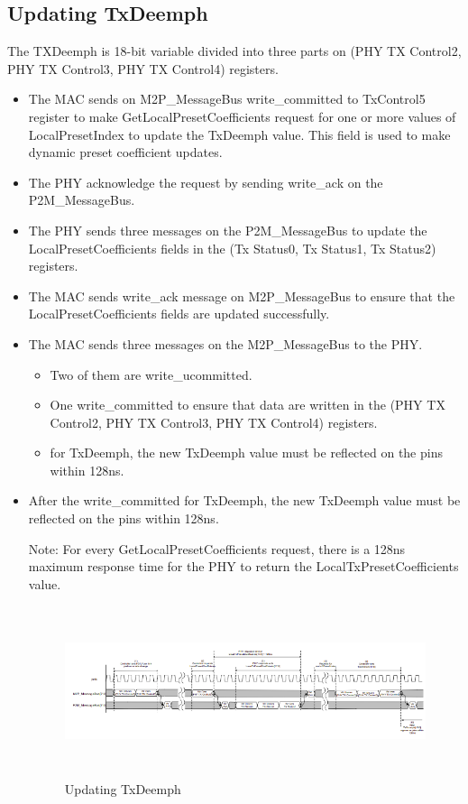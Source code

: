 \subsection{Updating TxDeemph}  
The TXDeemph is 18-bit variable divided into three parts on (PHY TX Control2, PHY TX Control3, PHY TX Control4) registers.
\begin{itemize}
    \item The MAC sends on M2P\_MessageBus write\_committed to TxControl5 register to make GetLocalPresetCoefficients request for one or more values of LocalPresetIndex to update the TxDeemph value.
This field is used to make dynamic preset coefficient updates.
\item The PHY acknowledge the request by sending write\_ack on the P2M\_MessageBus.
\item The PHY sends three messages on the P2M\_MessageBus to update the LocalPresetCoefficients fields in the (Tx Status0, Tx Status1, Tx Status2) registers.
\item The MAC sends write\_ack message on M2P\_MessageBus to ensure that the LocalPresetCoefficients fields are updated successfully.
\item The MAC sends three messages on the M2P\_MessageBus to the PHY.
\begin{itemize}
    \item Two of them are write\_ucommitted.

    \item One write\_committed to ensure that data are written in the (PHY TX Control2, PHY TX Control3, PHY TX Control4) registers. 

    \item for TxDeemph, the new TxDeemph value must be reflected on the pins within 128ns.
\end{itemize}
\item After the write\_committed for TxDeemph, the new TxDeemph value must be reflected on the pins within 128ns. \newline \newline 

Note: For every GetLocalPresetCoefficients request, there is a 128ns maximum response time for the PHY to return the LocalTxPresetCoefficients value. 

\begin{figure}[H]
  \centering
  \includegraphics[width=150mm,height=50mm]{images/clk_diagram/deemph.png}
  \caption{Updating TxDeemph}
  \label{lane}
\end{figure}


\end{itemize}

